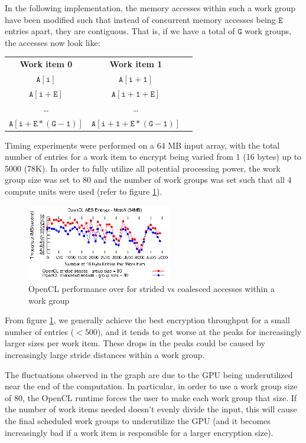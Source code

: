 \documentclass[conference,10pt]{IEEEtran}
\begin{document}
In the following implementation, the memory accesses within such a work group have been modified 
such that instead of concurrent memory accesses being $\mathtt{E}$ entries apart, they are 
contiguous.  That is, if we have a total of $\mathtt{G}$ work groups, the accesses now look like:

\begin{table}[h]
\centering
\begin{tabular}{ccc}
    \textbf{Work item 0} & \textbf{Work item 1} \\
    $\mathtt{A[i]}$         & $\mathtt{A[i + 1]}$ \\
    $\mathtt{A[i + E]}$     & $\mathtt{A[i + 1 + E]}$ \\
    \ldots       & \ldots \\
    $\mathtt{A[i + E*(G - 1)]}$ & $\mathtt{A[i + 1 + E*(G - 1)]}$ \\
\end{tabular}
\end{table}

Timing experiments were performed on a 64 MB input array, with the total number of entries for a 
work item to encrypt being varied from 1 (16 bytes) up to 5000 (78K).  In order to fully utilize all 
potential processing power, the work group size was set to 80 and the number of work groups was set 
such that all 4 compute units were used (refer to figure \ref{fig:coalesce}).

\begin{figure}[!t]
\centering
\includegraphics[width=2.5in]{../final/motox/4.2/sample_opencl_aes_entries.64MB.4_work_groups.5000_max_entries.both.eps}
\caption{OpenCL performance over for strided vs coalesced accesses within a work group}
\label{fig:coalesce}
\end{figure}

From figure \ref{fig:coalesce}, we generally achieve the best encryption throughput for a small 
number of entries ($< 500$), and it tends to get worse at the peaks for increasingly larger sizes 
per work item.  These drops in the peaks could be caused by increasingly large stride distances 
within a work group. 

The fluctuations observed in the graph are due to the GPU being underutilized near the end of the 
computation.  In particular, in order to use a work group size of 80, the OpenCL runtime forces the 
user to make each work group that size.  If the number of work items needed doesn't evenly divide 
the input, this will cause the final scheduled work groups to underutilize the GPU (and it becomes 
increasingly bad if a work item is responsible for a larger encryption size).
\end{document}
